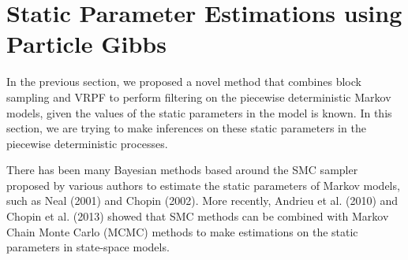 \documentclass[12pt,a4paper]{article}
\begin{document}
\section{Static Parameter Estimations using Particle Gibbs}
In the previous section, we proposed a novel method that combines block sampling and VRPF to perform filtering on the piecewise deterministic Markov models, given the values of the static parameters in the model is known. In this section, we are trying to make inferences on these static parameters in the piecewise deterministic processes. 

There has been many Bayesian methods based around the SMC sampler proposed by various authors to estimate the static parameters of Markov models, such as Neal (2001) and Chopin (2002). More recently, Andrieu et al. (2010) and Chopin et al. (2013) showed that SMC methods can be combined with Markov Chain Monte Carlo (MCMC) methods to make estimations on the static parameters in state-space models. 
\end{document}
